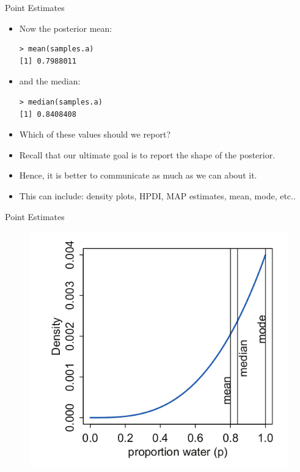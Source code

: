 \documentclass[handout]{beamer}
\begin{document}
\begin{frame}[fragile]{Point Estimates}
\scriptsize{
\begin{itemize}

\item Now the posterior mean:

\begin{verbatim}
> mean(samples.a)
[1] 0.7988011
\end{verbatim}


\item and the median:

\begin{verbatim}
> median(samples.a)
[1] 0.8408408
\end{verbatim}


\item Which of these values should we report?

\item Recall that our ultimate goal is to report the shape of the posterior.

\item Hence, it is better to communicate as much as we can about it.  

\item This can include: density plots, HPDI, MAP estimates, mean, mode, etc..


\end{itemize}



} 

\end{frame}

\begin{frame}{Point Estimates}
\scriptsize{

   \begin{figure}[h!]
	\centering
	\includegraphics[scale=0.45]{pics/posterior_points.png}
	\end{figure} 




} 

\end{frame}
\end{document}

